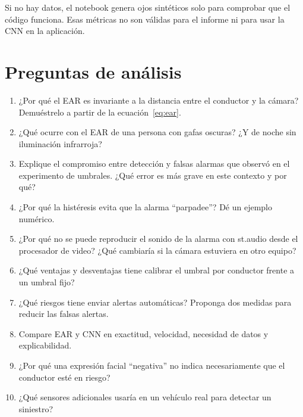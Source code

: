 \documentclass[11pt,a4paper]{article}
\newcommand{\codigoguion}{\textunderscore\allowbreak}
\newcommand{\codigo}[1]{{\small\ttfamily\let\_\codigoguion #1}}
\begin{document}
\begin{aviso}
Si no hay datos, el notebook genera ojos sintéticos solo para comprobar que el código funciona. Esas
métricas no son válidas para el informe ni para usar la CNN en la aplicación.
\end{aviso}

\section{Preguntas de análisis}
\begin{enumerate}
  \item ¿Por qué el EAR es invariante a la distancia entre el conductor y la cámara? Demuéstrelo a partir de
        la ecuación~\eqref{eq:ear}.
  \item ¿Qué ocurre con el EAR de una persona con gafas oscuras? ¿Y de noche sin iluminación infrarroja?
  \item Explique el compromiso entre detección y falsas alarmas que observó en el experimento de umbrales.
        ¿Qué error es más grave en este contexto y por qué?
  \item ¿Por qué la histéresis evita que la alarma ``parpadee''? Dé un ejemplo numérico.
  \item ¿Por qué no se puede reproducir el sonido de la alarma con \codigo{st.audio} desde el procesador de
        video? ¿Qué cambiaría si la cámara estuviera en otro equipo?
  \item ¿Qué ventajas y desventajas tiene calibrar el umbral por conductor frente a un umbral fijo?
  \item ¿Qué riesgos tiene enviar alertas automáticas? Proponga dos medidas para reducir las falsas alertas.
  \item Compare EAR y CNN en exactitud, velocidad, necesidad de datos y explicabilidad.
  \item ¿Por qué una expresión facial ``negativa'' no indica necesariamente que el conductor esté en riesgo?
  \item ¿Qué sensores adicionales usaría en un vehículo real para detectar un siniestro?
\end{enumerate}

\end{document}
